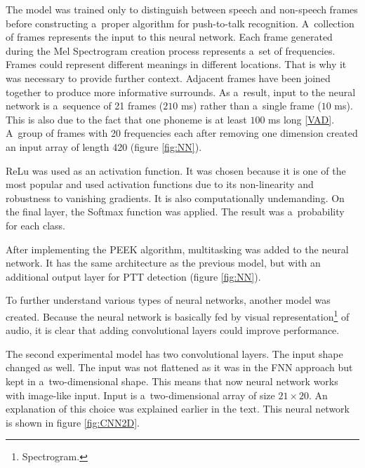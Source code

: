     The model was trained only to distinguish between speech and non-speech frames before constructing a~proper algorithm for push-to-talk recognition. A~collection of frames represents the input to this neural network. Each frame generated during the Mel Spectrogram creation process represents a~set of frequencies. Frames could represent different meanings in different locations. That is why it was necessary to provide further context. Adjacent frames have been joined together to produce more informative surrounds. As a~result, input to the neural network is a~sequence of 21 frames ($210$ ms) rather than a~single frame ($10$ ms). This is also due to the fact that one phoneme is at least $100$ ms long \ref{VAD}. A~group of frames with 20 frequencies each after removing one dimension created an input array of length 420 (figure \ref{fig:NN}).

    ReLu was used as an activation function. It was chosen because it is one of the most popular and used activation functions due to its non-linearity and robustness to vanishing gradients. It is also computationally undemanding. On the final layer, the Softmax function was applied. The result was a~probability for each class. 
    
    After implementing the PEEK algorithm, multitasking was added to the neural network. It has the same architecture as the previous model, but with an additional output layer for PTT detection (figure \ref{fig:NN}). 
    
    To further understand various types of neural networks, another model was created. Because the neural network is basically fed by visual representation\footnote{Spectrogram.} of audio, it is clear that adding convolutional layers could improve performance. 

    

    The second experimental model has two convolutional layers. The input shape changed as well. The input was not flattened as it was in the FNN approach but kept in a~two-dimensional shape. This means that now neural network works with image-like input. Input is a~two-dimensional array of size $21\times20$. An explanation of this choice was explained earlier in the text. This neural network is shown in figure \ref{fig:CNN2D}. 

